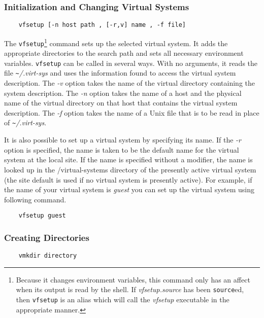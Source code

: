 \subsubsection{Initialization and Changing Virtual Systems}

\begin{verbatim}
    vfsetup [-n host path , [-r,v] name , -f file]
\end{verbatim}

The {\tt vfsetup}\footnote{Because it changes environment variables,
this command only has an affect when its output is read by the shell.
If {\it vfsetup.source} has been {\tt source}ed, then {\tt vfsetup} is
an alias which will call the {\it vfsetup} executable in the
appropriate manner.} command sets up the selected virtual system.  It
adds the appropriate directories to the search path and sets all
necessary environment variables. {\tt vfsetup} can be called in
several ways.  With no arguments, it reads the file {\it
\verb+~+/.virt-sys} and uses the information found to access the
virtual system description.  The {\em -v} option takes the name of the
virtual directory containing the system description.  The {\em -n}
option takes the name of a host and the physical name of the virtual
directory on that host that contains the virtual system description.
The {\em -f} option takes the name of a Unix file that is to be read
in place of {\it \verb+~+/.virt-sys}.

It is also possible to set up a virtual system by specifying its name.
If the {\em -r} option is specified, the name is taken to be the
default name for the virtual system at the local site.  If the name is
specified without a modifier, the name is looked up in the {\sc
/virtual-systems} directory of the presently active virtual system
(the site default is used if no virtual system is presently active).
For example, if the name of your virtual system is {\it guest} you can
set up the virtual system using following command.

\begin{verbatim}
    vfsetup guest
\end{verbatim}


\subsubsection{Creating Directories}

\begin{verbatim}
    vmkdir directory
\end{verbatim}

